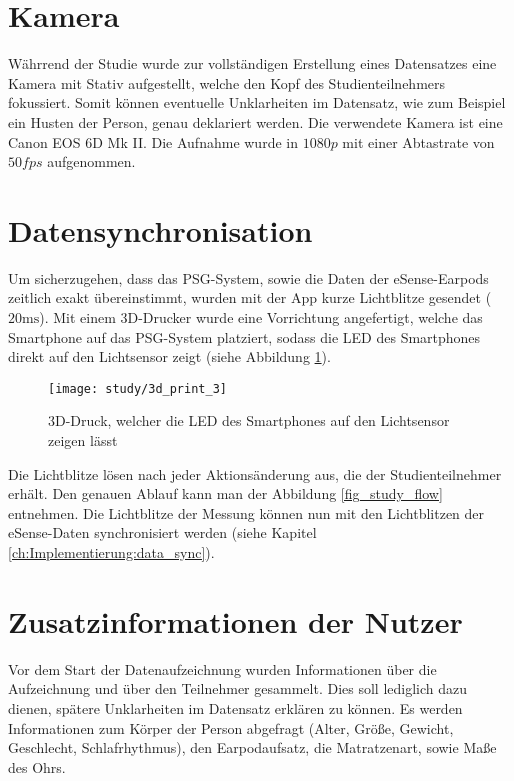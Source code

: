 \section{Kamera}
\label{ch:sa:camera}
Währrend der Studie wurde zur vollständigen Erstellung eines Datensatzes eine Kamera mit Stativ aufgestellt, welche den Kopf des Studienteilnehmers fokussiert. 
Somit können eventuelle Unklarheiten im Datensatz, wie zum Beispiel ein Husten der Person, genau deklariert werden. 
Die verwendete Kamera ist eine \glqq Canon EOS 6D Mk II\grqq.
Die Aufnahme wurde in $1080p$ mit einer Abtastrate von $50fps$ aufgenommen.

\section{Datensynchronisation}
\label{ch:sa:data_synchronisation}
Um sicherzugehen, dass das PSG-System, sowie die Daten der eSense-Earpods zeitlich exakt übereinstimmt, wurden mit der App kurze Lichtblitze gesendet ($20 \si{\ms}$).
Mit einem 3D-Drucker wurde eine Vorrichtung angefertigt, welche das Smartphone auf das PSG-System platziert, sodass die LED des Smartphones direkt auf den Lichtsensor zeigt (siehe Abbildung \ref{study:3d_print}).

\begin{figure}[ht]
    \centering
    \texttt{[image: study/3d\_print\_3]}
    \caption{3D-Druck, welcher die LED des Smartphones auf den Lichtsensor zeigen lässt}
    \label{study:3d_print}
  \end{figure}

Die Lichtblitze lösen nach jeder Aktionsänderung aus, die der Studienteilnehmer erhält. 
Den genauen Ablauf kann man der Abbildung \ref{fig_study_flow} entnehmen.
Die Lichtblitze der Messung können nun mit den Lichtblitzen der eSense-Daten synchronisiert werden (siehe Kapitel \ref{ch:Implementierung:data_sync}).

\section{Zusatzinformationen der Nutzer}
\label{ch:sa:additionalUserStudiesInformation}
Vor dem Start der Datenaufzeichnung wurden Informationen über die Aufzeichnung und über den Teilnehmer gesammelt. 
Dies soll lediglich dazu dienen, spätere Unklarheiten im Datensatz erklären zu können.
Es werden Informationen zum Körper der Person abgefragt (Alter, Größe, Gewicht, Geschlecht, Schlafrhythmus), den Earpodaufsatz, die Matratzenart, sowie Maße des Ohrs.

